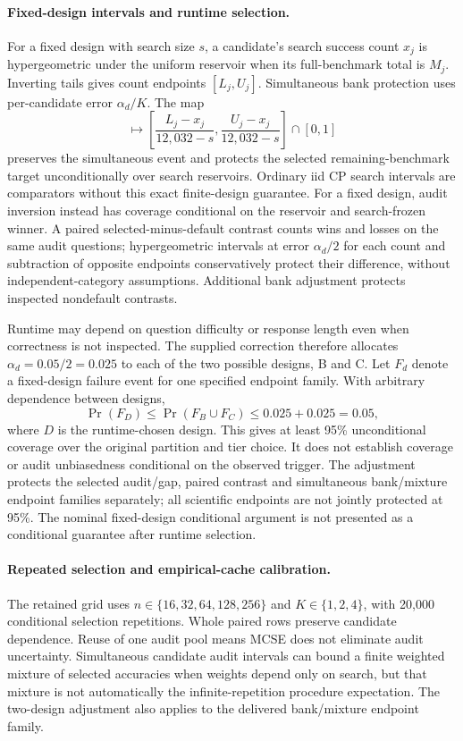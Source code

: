\paragraph{Fixed-design intervals and runtime selection.}
For a fixed design with search size $s$, a candidate's search success count $x_j$ is hypergeometric under the uniform reservoir when its full-benchmark total is $M_j$. Inverting tails gives count endpoints $[L_j,U_j]$. Simultaneous bank protection uses per-candidate error $\alpha_d/K$. The map
\begin{equation}
 [L_j,U_j]\longmapsto
 \left[\frac{L_j-x_j}{12{,}032-s},
       \frac{U_j-x_j}{12{,}032-s}\right]\cap[0,1]
\end{equation}
preserves the simultaneous event and protects the selected remaining-benchmark target unconditionally over search reservoirs. Ordinary iid CP search intervals are comparators without this exact finite-design guarantee. For a fixed design, audit inversion instead has coverage conditional on the reservoir and search-frozen winner. A paired selected-minus-default contrast counts wins and losses on the same audit questions; hypergeometric intervals at error $\alpha_d/2$ for each count and subtraction of opposite endpoints conservatively protect their difference, without independent-category assumptions. Additional bank adjustment protects inspected nondefault contrasts.

Runtime may depend on question difficulty or response length even when correctness is not inspected. The supplied correction therefore allocates $\alpha_d=0.05/2=0.025$ to each of the two possible designs, B and C. Let $F_d$ denote a fixed-design failure event for one specified endpoint family. With arbitrary dependence between designs,
\begin{equation}
 \Pr(F_{D})\leq\Pr(F_B\cup F_C)
 \leq 0.025+0.025=0.05,
\end{equation}
where $D$ is the runtime-chosen design. This gives at least 95\% unconditional coverage over the original partition and tier choice. It does not establish coverage or audit unbiasedness conditional on the observed trigger. The adjustment protects the selected audit/gap, paired contrast and simultaneous bank/mixture endpoint families separately; all scientific endpoints are not jointly protected at 95\%. The nominal fixed-design conditional argument is not presented as a conditional guarantee after runtime selection.

\paragraph{Repeated selection and empirical-cache calibration.}
The retained grid uses $n\in\{16,32,64,128,256\}$ and $K\in\{1,2,4\}$, with 20,000 conditional selection repetitions. Whole paired rows preserve candidate dependence. Reuse of one audit pool means MCSE does not eliminate audit uncertainty. Simultaneous candidate audit intervals can bound a finite weighted mixture of selected accuracies when weights depend only on search, but that mixture is not automatically the infinite-repetition procedure expectation. The two-design adjustment also applies to the delivered bank/mixture endpoint family.

